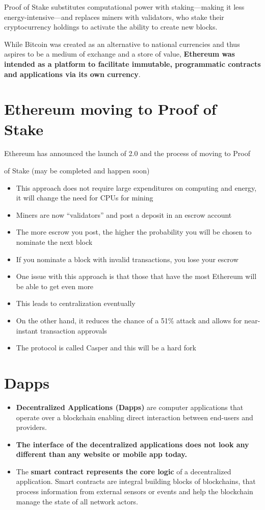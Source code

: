 Proof of Stake substitutes computational power with staking—making it less energy-intensive—and replaces miners with validators, who stake their cryptocurrency holdings to activate the ability to create new blocks.

While Bitcoin was created as an alternative to national currencies and thus aspires to be a medium of exchange and a store of value, \textbf{Ethereum was intended as a platform to facilitate immutable, programmatic contracts and applications via its own currency}.

\section{Ethereum moving to Proof of Stake}

Ethereum has announced the launch of 2.0 and the process of moving to Proof

of Stake (may be completed and happen soon)
\begin{itemize}
	\item This approach does not require large expenditures on computing and energy, it will change the need for CPUs for mining
	\item Miners are now ``validators'' and post a deposit in an escrow account
	\item The more escrow you post, the higher the probability you will be chosen to nominate the next block
	\item If you nominate a block with invalid transactions, you lose your escrow
	\item One issue with this approach is that those that have the most Ethereum will be able to get even more
	\item This leads to centralization eventually
	\item On the other hand, it reduces the chance of a 51\% attack and allows for near-instant transaction approvals
	\item The protocol is called Casper and this will be a hard fork
\end{itemize}

\section{Dapps}

\begin{itemize}
	\item \textbf{Decentralized Applications (Dapps)} are computer applications that operate over a blockchain enabling direct interaction between end-users and providers.
	\item \textbf{The interface of the decentralized applications does not look any different than any website or mobile app today.}
	\item The \textbf{smart contract represents the core logic} of a decentralized application. Smart contracts are integral building blocks of blockchains, that process information from external sensors or events and help the blockchain manage the state of all network actors.
\end{itemize}

